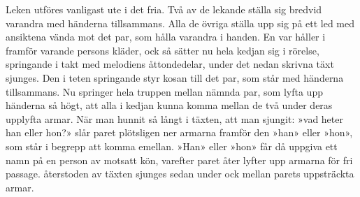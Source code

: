 \vspace{5mm}
Leken utföres vanligast ute i det fria. Två av de lekande
ställa sig bredvid varandra med händerna tillsammans.
Alla de övriga ställa upp sig på ett led med ansiktena vända mot det
par, som hålla varandra i handen. En var håller i framför varande
persons kläder, ock så sätter nu hela kedjan sig i rörelse, springande
i takt med melodiens åttondedelar, under det nedan skrivna täxt
sjunges. Den i teten springande styr kosan till det par, som står
med händerna tillsammans. Nu springer hela truppen mellan
nämnda par, som lyfta upp händerna så högt, att alla i kedjan
kunna komma mellan de två under deras upplyfta armar. När
man hunnit så långt i täxten, att man sjungit: »vad heter han
eller hon?» slår paret plötsligen ner armarna framför den »han»
eller »hon», som står i begrepp att komma emellan. »Han» eller
»hon» får då uppgiva ett namn på en person av motsatt kön,
varefter paret åter lyfter upp armarna för fri passage. återstoden
av täxten sjunges sedan under ock mellan parets uppsträckta armar.
